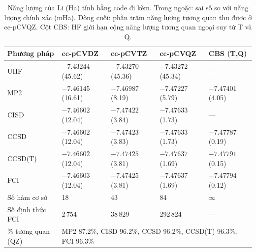 \begin{table}[h]
\centering\small
\caption{Năng lượng của Li (Ha) tính bằng code đi kèm. Trong ngoặc: sai số so với năng lượng chính xác (mHa). Dòng cuối: phần trăm năng lượng tương quan thu được ở cc-pCVQZ. Cột CBS: HF giới hạn cộng năng lượng tương quan ngoại suy từ T và Q.}
\label{tab:sauhf}
\begin{tabular}{@{}lllll@{}}
\toprule
Phương pháp & cc-pCVDZ & cc-pCVTZ & cc-pCVQZ & CBS (T,Q) \\
\midrule
UHF & $-7.43244$ (45.62) & $-7.43270$ (45.36) & $-7.43272$ (45.34) & --- \\
MP2 & $-7.46145$ (16.61) & $-7.46987$ (8.19) & $-7.47227$ (5.79) & $-7.47401$ (4.05) \\
CISD & $-7.46602$ (12.04) & $-7.47422$ (3.84) & $-7.47633$ (1.73) & --- \\
CCSD & $-7.46602$ (12.04) & $-7.47423$ (3.83) & $-7.47633$ (1.73) & $-7.47787$ (0.19) \\
CCSD(T) & $-7.46602$ (12.04) & $-7.47425$ (3.81) & $-7.47637$ (1.69) & $-7.47791$ (0.15) \\
FCI & $-7.46603$ (12.04) & $-7.47425$ (3.81) & $-7.47637$ (1.69) & $-7.47794$ (0.12) \\
\midrule
Số hàm cơ sở & 18 & 43 & 84 & $\infty$ \\
Số định thức FCI & 2\,754 & 38\,829 & 292\,824 & --- \\
\% tương quan (QZ) & \multicolumn{4}{l}{MP2 87.2\%, CISD 96.2\%, CCSD 96.2\%, CCSD(T) 96.3\%, FCI 96.3\%} \\
\bottomrule
\end{tabular}
\end{table}
